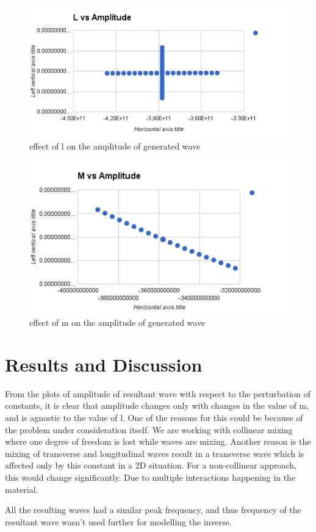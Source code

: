 \begin{figure}
\begin{center}
\includegraphics[scale=0.7]{images/chapter_4/lvsamp.png}
\caption{effect of l on the amplitude of generated wave}
\end{center}
\end{figure}

\begin{figure}
\begin{center}
\includegraphics[scale=0.7]{images/chapter_4/mvsamp.png}
\caption{effect of m on the amplitude of generated wave}
\end{center}
\end{figure}
\section{Results and Discussion}
From the plots of amplitude of resultant wave with respect to the perturbation of constants, it is clear that amplitude changes only with changes in the value of m, and is agnostic to the value of l. One of the reasons for this could be because of the problem under consideration itself. We are working with collinear mixing where one degree of freedom is lost while waves are mixing. Another reason is the mixing of transverse and longitudinal waves result in a transverse wave which is affected only by this constant in a 2D situation. For a non-collinear approach, this would change significantly. Due to multiple interactions happening in the material.

All the resulting waves had a similar peak frequency, and thus frequency of the resultant wave wasn't used further for modelling the inverse.